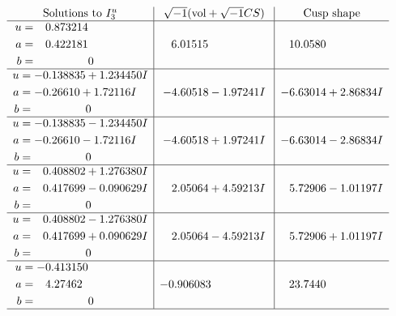 \documentclass[1p]{elsarticle_modified}
\theoremstyle{definition}
\newcommand{\I}{\sqrt{-1}}
\begin{document}
$$\begin{array}{c|c|c}  
\text{Solutions to }I^u_{3}& \I (\text{vol} + \sqrt{-1}CS) & \text{Cusp shape}\\
 \hline 
\begin{aligned}
u &= \phantom{-}0.873214\phantom{ +0.000000I} \\
a &= \phantom{-}0.422181\phantom{ +0.000000I} \\
b &= \phantom{-0.000000 } 0\end{aligned}
 & \phantom{-}6.01515\phantom{ +0.000000I} & \phantom{-}10.0580\phantom{ +0.000000I} \\ \hline\begin{aligned}
u &= -0.138835 + 1.234450 I \\
a &= -0.26610 + 1.72116 I \\
b &= \phantom{-0.000000 } 0\end{aligned}
 & -4.60518 - 1.97241 I & -6.63014 + 2.86834 I \\ \hline\begin{aligned}
u &= -0.138835 - 1.234450 I \\
a &= -0.26610 - 1.72116 I \\
b &= \phantom{-0.000000 } 0\end{aligned}
 & -4.60518 + 1.97241 I & -6.63014 - 2.86834 I \\ \hline\begin{aligned}
u &= \phantom{-}0.408802 + 1.276380 I \\
a &= \phantom{-}0.417699 - 0.090629 I \\
b &= \phantom{-0.000000 } 0\end{aligned}
 & \phantom{-}2.05064 + 4.59213 I & \phantom{-}5.72906 - 1.01197 I \\ \hline\begin{aligned}
u &= \phantom{-}0.408802 - 1.276380 I \\
a &= \phantom{-}0.417699 + 0.090629 I \\
b &= \phantom{-0.000000 } 0\end{aligned}
 & \phantom{-}2.05064 - 4.59213 I & \phantom{-}5.72906 + 1.01197 I \\ \hline\begin{aligned}
u &= -0.413150\phantom{ +0.000000I} \\
a &= \phantom{-}4.27462\phantom{ +0.000000I} \\
b &= \phantom{-0.000000 } 0\end{aligned}
 & -0.906083\phantom{ +0.000000I} & \phantom{-}23.7440\phantom{ +0.000000I}\\
 \hline 
 \end{array}$$\newpage\newpage\renewcommand{\arraystretch}{1}
\end{document}

